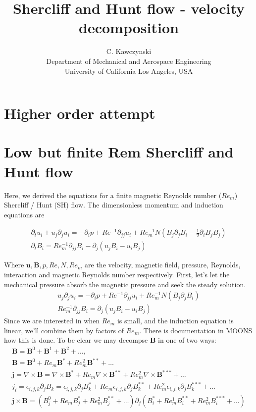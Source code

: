 \documentclass[11pt]{article}
\newcommand{\B}{\mathbf{B}}
\newcommand{\U}{\mathbf{u}}
\newcommand{\curl}{\nabla \times}
\newcommand{\PD}{\partial}
\newcommand{\J}{\mathbf{j}}
\begin{document}
\doublespacing
\title{Shercliff and Hunt flow - velocity decomposition}
\author{C. Kawczynski \\
Department of Mechanical and Aerospace Engineering \\
University of California Los Angeles, USA\\
}
\maketitle

\section{Higher order attempt}
\section{Low but finite Rem Shercliff and Hunt flow}
Here, we derived the equations for a finite magnetic Reynolds number ($Re_m$) Shercliff / Hunt (SH) flow. The dimensionless momentum and induction equations are

\begin{equation}\begin{aligned}
\PD_t u_i+u_j\PD_j u_i =-\PD_i p+ Re^{-1} \PD_{jj} u_i + Re_m^{-1} N (B_j \PD_j B_i - \tfrac{1}{2} \PD_i B_j B_j) \\
\PD_t B_i = Re_m^{-1} \PD_{jj} B_i - \PD_j (u_j B_i - u_i B_j)
\end{aligned} \end{equation}

Where $\U,\B,p,Re,N,Re_m$ are the velocity, magnetic field, pressure, Reynolds, interaction and magnetic Reynolds number respectively. First, let's let the mechanical pressure absorb the magnetic pressure and seek the steady solution.
\begin{equation}\begin{aligned}
u_j\PD_j u_i =-\PD_i p+ Re^{-1} \PD_{jj} u_i + Re_m^{-1} N (B_j \PD_j B_i) \\
Re_m^{-1} \PD_{jj} B_i = \PD_j (u_j B_i - u_i B_j)
\end{aligned} \end{equation}
Since we are interested in when $Re_m$ is small, and the induction equation is linear, we'll combine them by factors of $Re_m$. There is documentation in MOONS how this is done. To be clear we may decompse $\B$ in one of two ways:
\begin{equation}\begin{aligned}
	\B = \B^0 + \B^1 + \B^2 + \hdots , \\
	\B = \B^0 + Re_m \B^* + Re_m^2 \B^{**} + \hdots \\
	\J = \curl \B = \curl \B^* + Re_m \curl \B^{**} + Re_m^2 \curl \B^{***} + \hdots \\
	 j_i = \epsilon_{i,j,k} \PD_j B_k = \epsilon_{i,j,k} \PD_j B_k^* + Re_m \epsilon_{i,j,k} \PD_j B_k^{**} + Re_m^2 \epsilon_{i,j,k} \PD_j B_k^{***} + \hdots \\
	\J \times \B = (B_j^0+Re_m B_j^*+Re_m^2 B_j^{**} + \hdots) \PD_j (B_i^*+Re_m^1 B_i^{**}+Re_m^2 B_i^{***} + \hdots) \\
\end{aligned} \end{equation}
\end{document}
